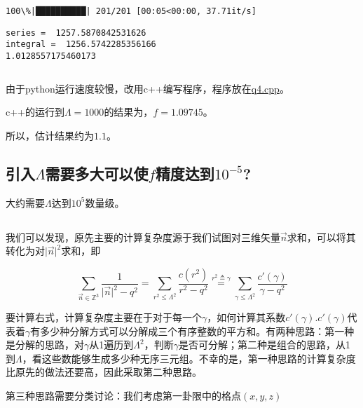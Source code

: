 \documentclass[11pt]{article}
\begin{document}
    \begin{Verbatim}[commandchars=\\\{\}]
100\%|██████████| 201/201 [00:05<00:00, 37.71it/s]
    \end{Verbatim}

    \begin{Verbatim}[commandchars=\\\{\}]
series =  1257.5870842531626
integral =  1256.5742285356166
1.0128557175460173
    \end{Verbatim}

    \begin{Verbatim}[commandchars=\\\{\}]

    \end{Verbatim}

由于python运行速度较慢，改用c++编写程序，程序放在\url{q4.cpp}。


c++的运行到\(\Lambda=1000\)的结果为，\(f=1.09745\)。

所以，估计结果约为\(1.1\)。

\subsection{引入\(\Lambda\)需要多大可以使\(f\)精度达到\(10^{-5}\)?}
大约需要\(\Lambda\)达到\(10^5\)数量级。

\subsection{}

    我们可以发现，原先主要的计算复杂度源于我们试图对三维矢量\(\vec{n}\)求和，可以将其转化为对\(\vert\vec{n}\vert^{2}\)求和，即

\[
\sum\limits_{
	\vec { n }
	\in\mathbb{Z} ^ 3}\frac{1}{\vert\vec{n}\vert^2-q^2}=\sum\limits_{
	r ^ 2\leq\Lambda ^ 2}\frac{c(r^2)}{
	r ^ 2 - q ^ 2}\overset{
	r ^ 2\triangleq\gamma}{
	=}\sum\limits_{
	\gamma\leq\Lambda ^ 2}\frac{c'(\gamma)}{\gamma-q^2}
\]

要计算右式，计算复杂度主要在于对于每一个\( \gamma \)，如何计算其系数\(c'(\gamma)\).\(c'(\gamma)\)代表着\(\gamma\)有多少种分解方式可以分解成三个有序整数的平方和。有两种思路：第一种是分解的思路，对\(\gamma\)从1遍历到\(\Lambda^2\)，判断\(\gamma\)是否可分解；第二种是组合的思路，从1到\(\Lambda\)，看这些数能够生成多少种无序三元组。不幸的是，第一种思路的计算复杂度比原先的做法还要高，因此采取第二种思路。

第三种思路需要分类讨论：我们考虑第一卦限中的格点\((x,y,z)\) 
\end{document}
